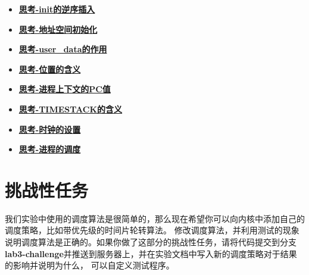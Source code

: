 \begin{itemize}
\item \hyperref[think-env_init]{\textbf{\textcolor{baseB}{思考-init的逆序插入}}}
\item \hyperref[think-env_setup_vm]{\textbf{\textcolor{baseB}{思考-地址空间初始化}}}
\item \hyperref[think-user-data]{\textbf{\textcolor{baseB}{思考-user\_data的作用}}}
\item \hyperref[think-位置]{\textbf{\textcolor{baseB}{思考-位置的含义}}}
\item \hyperref[think-pc]{\textbf{\textcolor{baseB}{思考-进程上下文的PC值}}}
\item \hyperref[think-TIMESTACK]{\textbf{\textcolor{baseB}{思考-TIMESTACK的含义}}}
\item \hyperref[think-时钟设置]{\textbf{\textcolor{baseB}{思考-时钟的设置}}}
\item \hyperref[think-进程调度]{\textbf{\textcolor{baseB}{思考-进程的调度}}}
\end{itemize}

\section{挑战性任务}
我们实验中使用的调度算法是很简单的，那么现在希望你可以向内核中添加自己的调度策略，比如带优先级的时间片轮转算法。
修改调度算法，并利用测试的现象说明调度算法是正确的。如果你做了这部分的挑战性任务，请将代码提交到分支
\textbf{lab3-challenge}并推送到服务器上，并在实验文档中写入新的调度策略对于结果的影响并说明为什么，
可以自定义测试程序。
